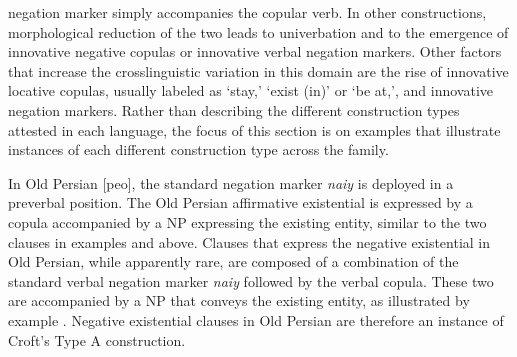 ﻿\documentclass[output=paper]{langsci/langscibook}
\begin{document}
\begin{exe}
{negation marker simply accompanies the copular verb. In other
constructions, morphological reduction of the two leads to univerbation and
to the emergence of innovative negative copulas or innovative verbal
negation markers. Other factors that increase the crosslinguistic variation
in this domain are the rise of innovative locative copulas, usually labeled
as `stay,' `exist (in)' or `be at,', and innovative negation markers.
Rather than describing the different construction types attested in each
language, the focus of this section is on examples that illustrate
instances of each different construction type across the family.

In Old Persian [peo], the standard negation marker \textit{naiy} is
deployed in a preverbal position. The Old Persian affirmative existential
is expressed by a copula accompanied by a NP expressing the existing
entity, similar to the two clauses in examples 
and  above. Clauses that express the
negative existential in
Old Persian, while apparently rare, are composed of a combination of the
standard verbal negation marker \textit{naiy} followed by the verbal
copula. These two are accompanied by a NP that conveys the existing entity,
as illustrated by example . Negative
existential clauses in Old Persian are therefore an instance of Croft's
Type A construction.
%
\begin{exe}
\end{exe}

}
\end{exe}
\end{document}
